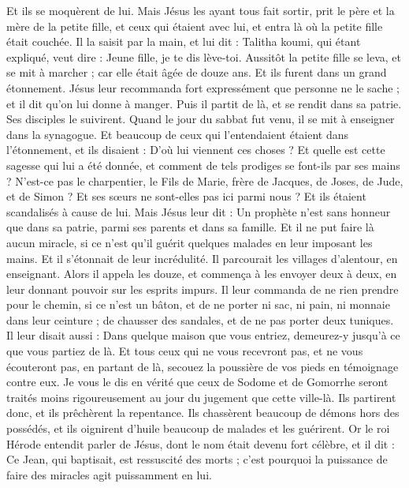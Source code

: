 \begin{multicols}{2}
Et ils se moquèrent de lui. Mais Jésus les ayant tous fait sortir, prit le père et la mère de la petite fille, et ceux qui étaient avec lui, et entra là où la petite fille était couchée.
Il la saisit par la main, et lui dit : Talitha koumi, qui étant expliqué, veut dire : Jeune fille, je te dis lève-toi.
Aussitôt la petite fille se leva, et se mit à marcher ; car elle était âgée de douze ans. Et ils furent dans un grand étonnement.
Jésus leur recommanda fort expressément que personne ne le sache ; et il dit qu'on lui donne à manger.
\VerseOne{}Puis il partit de là, et se rendit dans sa patrie. Ses disciples le suivirent.
Quand le jour du sabbat fut venu, il se mit à enseigner dans la synagogue. Et beaucoup de ceux qui l'entendaient étaient dans l'étonnement, et ils disaient : D'où lui viennent ces choses ? Et quelle est cette sagesse qui lui a été donnée, et comment de tels prodiges se font-ils par ses mains ?
N’est-ce pas le charpentier, le Fils de Marie, frère de Jacques, de Joses, de Jude, et de Simon ? Et ses sœurs ne sont-elles pas ici parmi nous ? Et ils étaient scandalisés à cause de lui.
Mais Jésus leur dit : Un prophète n'est sans honneur que dans sa patrie, parmi ses parents et dans sa famille.
Et il ne put faire là aucun miracle, si ce n’est qu'il guérit quelques malades en leur imposant les mains.
Et il s'étonnait de leur incrédulité. Il parcourait les villages d'alentour, en enseignant.
Alors il appela les douze, et commença à les envoyer deux à deux, en leur donnant pouvoir sur les esprits impurs.
Il leur commanda de ne rien prendre pour le chemin, si ce n’est un bâton, et de ne porter ni sac, ni pain, ni monnaie dans leur ceinture ;
de chausser des sandales, et de ne pas porter deux tuniques.
Il leur disait aussi : Dans quelque maison que vous entriez, demeurez-y jusqu'à ce que vous partiez de là.
Et tous ceux qui ne vous recevront pas, et ne vous écouteront pas, en partant de là, secouez la poussière de vos pieds en témoignage contre eux. Je vous le dis en vérité que ceux de Sodome et de Gomorrhe seront traités moins rigoureusement au jour du jugement que cette ville-là.
Ils partirent donc, et ils prêchèrent la repentance.
Ils chassèrent beaucoup de démons hors des possédés, et ils oignirent d'huile beaucoup de malades et les guérirent.
Or le roi Hérode entendit parler de Jésus, dont le nom était devenu fort célèbre, et il dit : Ce Jean, qui baptisait, est ressuscité des morts ; c'est pourquoi la puissance de faire des miracles agit puissamment en lui.

\end{multicols}
